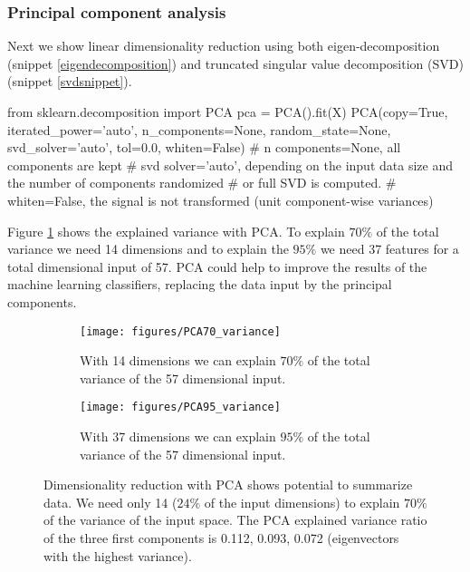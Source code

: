 \documentclass[11pt]{article}
\theoremstyle{definition}
\theoremstyle{remark}
\begin{document}
\subsubsection{Principal component analysis}
\label{sse:resPCA}
Next we show linear dimensionality reduction using both eigen-decomposition (snippet \ref{eigendecomposition}) and truncated singular value decomposition (SVD) (snippet \ref{svdsnippet}). 

\begin{code}[caption=PCA eigenvectors, label=eigendecomposition]
from sklearn.decomposition import PCA
pca = PCA().fit(X)
PCA(copy=True, iterated_power='auto', n_components=None, random_state=None,
  svd_solver='auto', tol=0.0, whiten=False)
# n components=None, all components are kept
# svd solver='auto', depending on the input data size and the number of components randomized
# or full SVD is computed.
# whiten=False, the signal is not transformed (unit component-wise variances)
\end{code}

Figure \ref{fig:PCA_variance} shows the explained variance with PCA. To explain $70\%$ of the total variance we need 14 dimensions and to explain the $95\%$ we need 37 features for a total dimensional input of 57. PCA could help to improve the results of the machine learning classifiers, replacing the data input by the principal components. 

\begin{figure}[H] 
    \centering
    \begin{subfigure}[t]{.4\columnwidth}
        \centering
        \texttt{[image: figures/PCA70\_variance]}
        \caption{With 14 dimensions we can explain $70\%$ of the total variance of the 57 dimensional input.}
    \end{subfigure}
    \hfill %
    \begin{subfigure}[t]{.4\columnwidth}
        \centering
        \texttt{[image: figures/PCA95\_variance]}
        \caption{With 37 dimensions we can explain $95\%$ of the total variance of the 57 dimensional input.}
    \end{subfigure}%
    \caption{Dimensionality reduction with PCA shows potential to summarize data. We need only 14 ($24\%$ of the input dimensions) to explain  $70\%$ of the variance of the input space. The PCA explained variance ratio of the three first components is 0.112, 0.093, 0.072 (eigenvectors with the highest variance).} \label{fig:PCA_variance}
\end{figure}
\end{document}
